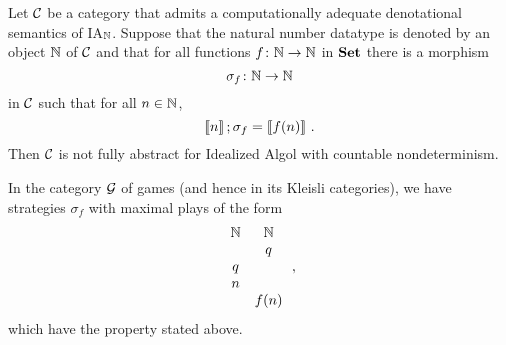 \documentclass{article}
\begin{document}
\begin{proposition}
  Let ${\mathcal{C}}$ be a category that admits a computationally adequate denotational semantics of IA${}_{\mathbb{N}}$.  
  Suppose that the natural number datatype is denoted by an object $\mathbb{N}$ of ${\mathcal{C}}$ and that for all functions $f \colon \mathbb{N} \to \mathbb{N}$ in ${\normalfont\textbf{Set}}$ there is a morphism
  \[
    \sigma_f \colon \mathbb{N} \to \mathbb{N}
    \]
  in ${\mathcal{C}}$ such that for all $n\in \mathbb{N}$, 
  \[
    \left\llbracket n\right\rrbracket;\sigma_f = \left\llbracket f(n)\right\rrbracket\,.
    \]
  Then ${\mathcal{C}}$ is not fully abstract for Idealized Algol with countable nondeterminism.
  \label{PropNotFullyAbstract}
\end{proposition}
\begin{example}
  In the category $\mathcal G$ of games (and hence in its Kleisli categories), we have strategies $\sigma_f$ with maximal plays of the form
  \[
    \begin{array}{cc}
      \mathbb{N} & \mathbb{N} \\
          &  q  \\
       q  &     \\
       n  &     \\
          & f(n)
    \end{array}\,,
    \]
  which have the property stated above.
\end{example}
\end{document}
